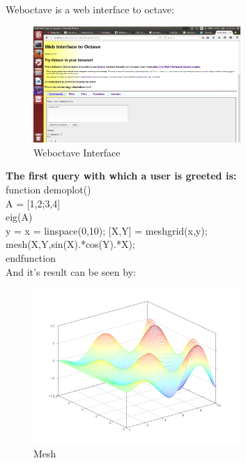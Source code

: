   \newpage
  Weboctave is a web interface to octave:\\
  \begin{figure}[!ht]
  	\centering
  	\includegraphics[width=0.7\textwidth]{images/interface.png}                
  	\caption{Weboctave Interface}
  	\hspace{-1.5em}
  \end{figure}
  

\noindent \textbf { The first query with which a user is greeted is:}\\

\noindent function demoplot()\\
A = [1,2;3,4]\\
eig(A)\\
y = x = linspace(0,10);
[X,Y] = meshgrid(x,y);\\
mesh(X,Y,sin(X).*cos(Y).*X);\\
endfunction\\

And it's result can be seen by: 

 \begin{figure}[!ht]
 	\centering
 	\includegraphics[width=0.7\textwidth]{images/plot1.png}                
 	\caption{Mesh}
 	\hspace{-1.5em}
 \end{figure}
 
